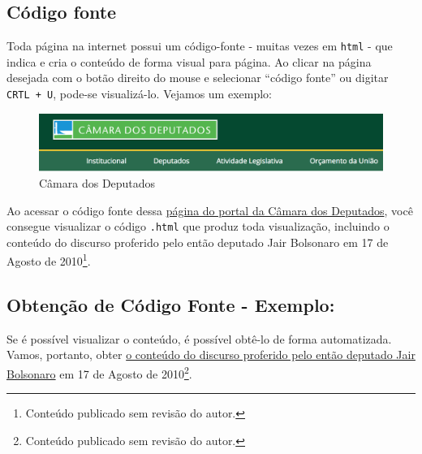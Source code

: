 \documentclass[]{book}
\begin{document}
\hypertarget{cuxf3digo-fonte}{%
\subsection{Código fonte}\label{cuxf3digo-fonte}}

Toda página na internet possui um código-fonte - muitas vezes em \texttt{html} - que indica
e cria o conteúdo de forma visual para página. Ao clicar na página desejada com o
botão direito do mouse e selecionar ``código fonte'' ou digitar \texttt{CRTL\ +\ U}, pode-se
visualizá-lo. Vejamos um exemplo:

\begin{figure}
\centering
\includegraphics[width=7.29167in,height=\textheight]{images/deputados.png}
\caption{Câmara dos Deputados}
\end{figure}

Ao acessar o código fonte dessa \href{https://www.camara.leg.br/internet/SitaqWeb/TextoHTML.asp?etapa=5\&nuSessao=174.4.53.O\&nuQuarto=56\&nuOrador=2\&nuInsercao=0\&dtHorarioQuarto=11:46\&sgFaseSessao=BC\&Data=17/08/2010\&txApelido=JAIR\%20BOLSONARO,\%20PP-RJ\&txFaseSessao=Breves\%20Comunica\%C3\%A7\%C3\%B5es\&txTipoSessao=Extraordin\%C3\%A1ria\%20-\%20CD\&dtHoraQuarto=11:46\&txEtapa=}{página do portal da Câmara dos Deputados}, você consegue visualizar o código \texttt{.html} que produz toda visualização,
incluindo o conteúdo do discurso proferido pelo então deputado Jair Bolsonaro em 17 de Agosto de 2010\footnote{Conteúdo publicado sem revisão do autor.}.

\hypertarget{obtenuxe7uxe3o-de-cuxf3digo-fonte---exemplo}{%
\subsection{Obtenção de Código Fonte - Exemplo:}\label{obtenuxe7uxe3o-de-cuxf3digo-fonte---exemplo}}

Se é possível visualizar o conteúdo, é possível obtê-lo de forma automatizada. Vamos, portanto,
obter \href{https://www.camara.leg.br/internet/SitaqWeb/TextoHTML.asp?etapa=5\&nuSessao=174.4.53.O\&nuQuarto=56\&nuOrador=2\&nuInsercao=0\&dtHorarioQuarto=11:46\&sgFaseSessao=BC\&Data=17/08/2010\&txApelido=JAIR\%20BOLSONARO,\%20PP-RJ\&txFaseSessao=Breves\%20Comunica\%C3\%A7\%C3\%B5es\&txTipoSessao=Extraordin\%C3\%A1ria\%20-\%20CD\&dtHoraQuarto=11:46\&txEtapa=}{o conteúdo do discurso proferido pelo então deputado Jair Bolsonaro} em 17 de Agosto de 2010\footnote{Conteúdo publicado sem revisão do autor.}.
\end{document}

